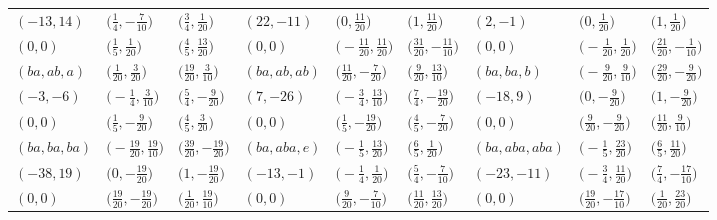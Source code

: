 \documentclass[pdftex]{sigma}
\theoremstyle{definition}
\numberwithin{equation}{section}
\begin{document}
\begin{landscape}
\begin{table}[th]
\begin{tabular}{|lll|lll|lll|}
\\
$(-13, 14)$ & $\bigl(\frac{1}{4}, -\frac{7}{10}\bigr)$ & $\bigl(\frac{3}{4}, \frac{1}{20}\bigr)$ & $(22, -11)$ & $\bigl(0, \frac{11}{20}\bigr)$ & $\bigl(1, \frac{11}{20}\bigr)$ & $(2, -1)$ & $\bigl(0, \frac{1}{20}\bigr)$ & $\bigl(1, \frac{1}{20}\bigr)$
\\
$(0, 0)$ & $\bigl(\frac{1}{5}, \frac{1}{20}\bigr)$ & $\bigl(\frac{4}{5}, \frac{13}{20}\bigr)$ & $(0, 0)$ & $\bigl(-\frac{11}{20}, \frac{11}{20}\bigr)$ & $\bigl(\frac{31}{20}, -\frac{11}{10}\bigr)$ & $(0, 0)$ & $\bigl(-\frac{1}{20}, \frac{1}{20}\bigr)$ & $\bigl(\frac{21}{20}, -\frac{1}{10}\bigr)$
\\\hline
$(ba, ab, a)$ & $\bigl(\frac{1}{20}, \frac{3}{20}\bigr)$ & $\bigl(\frac{19}{20}, \frac{3}{10}\bigr)$ & $(ba, ab, ab)$ & $\bigl(\frac{11}{20}, -\frac{7}{20}\bigr)$ & $\bigl(\frac{9}{20}, \frac{13}{10}\bigr)$ & $(ba, ba, b)$ & $\bigl(-\frac{9}{20}, \frac{9}{10}\bigr)$ & $\bigl(\frac{29}{20}, -\frac{9}{20}\bigr)$
\\
$(-3, -6)$ & $\bigl(-\frac{1}{4}, \frac{3}{10}\bigr)$ & $\bigl(\frac{5}{4}, -\frac{9}{20}\bigr)$ & $(7, -26)$ & $\bigl(-\frac{3}{4}, \frac{13}{10}\bigr)$ & $\bigl(\frac{7}{4}, -\frac{19}{20}\bigr)$ & $(-18, 9)$ & $\bigl(0, -\frac{9}{20}\bigr)$ & $\bigl(1, -\frac{9}{20}\bigr)$
\\
$(0, 0)$ & $\bigl(\frac{1}{5}, -\frac{9}{20}\bigr)$ & $\bigl(\frac{4}{5}, \frac{3}{20}\bigr)$ & $(0, 0)$ & $\bigl(\frac{1}{5}, -\frac{19}{20}\bigr)$ & $\bigl(\frac{4}{5}, -\frac{7}{20}\bigr)$ & $(0, 0)$ & $\bigl(\frac{9}{20}, -\frac{9}{20}\bigr)$ & $\bigl(\frac{11}{20}, \frac{9}{10}\bigr)$
\\\hline
$(ba, ba, ba)$ & $\bigl(-\frac{19}{20}, \frac{19}{10}\bigr)$ & $\bigl(\frac{39}{20}, -\frac{19}{20}\bigr)$ & $(ba, aba, e)$ & $\bigl(-\frac{1}{5}, \frac{13}{20}\bigr)$ & $\bigl(\frac{6}{5}, \frac{1}{20}\bigr)$ & $(ba, aba, aba)$ & $\bigl(-\frac{1}{5}, \frac{23}{20}\bigr)$ & $\bigl(\frac{6}{5}, \frac{11}{20}\bigr)$
\\
$(-38, 19)$ & $\bigl(0, -\frac{19}{20}\bigr)$ & $\bigl(1, -\frac{19}{20}\bigr)$ & $(-13, -1)$ & $\bigl(-\frac{1}{4}, \frac{1}{20}\bigr)$ & $\bigl(\frac{5}{4}, -\frac{7}{10}\bigr)$ & $(-23, -11)$ & $\bigl(-\frac{3}{4}, \frac{11}{20}\bigr)$ & $\bigl(\frac{7}{4}, -\frac{17}{10}\bigr)$
\\
$(0, 0)$ & $\bigl(\frac{19}{20}, -\frac{19}{20}\bigr)$ & $\bigl(\frac{1}{20}, \frac{19}{10}\bigr)$ & $(0, 0)$ & $\bigl(\frac{9}{20}, -\frac{7}{10}\bigr)$ & $\bigl(\frac{11}{20}, \frac{13}{20}\bigr)$ & $(0, 0)$ & $\bigl(\frac{19}{20}, -\frac{17}{10}\bigr)$ & $\bigl(\frac{1}{20}, \frac{23}{20}\bigr)$

\end{tabular}
\end{table}
\end{landscape}
\end{document}
